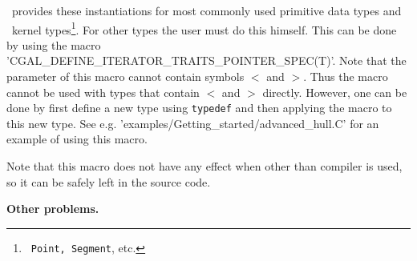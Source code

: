 \cgal\ provides
these instantiations for most commonly used primitive data types and
\cgal\ kernel types\footnote{\cgal\ \texttt{Point, Segment}, etc.}.
For other types the user must do this himself.  
This can be done by using the macro
\nonlinkedpath'CGAL_DEFINE_ITERATOR_TRAITS_POINTER_SPEC(T)'.
Note that the parameter of this macro cannot contain symbols $<$ and
$>$. Thus the macro cannot be used with types that contain $<$ and $>$
directly. However, one can be done by first define a new type using 
\texttt{typedef} and then applying the macro to this new type.
See e.g. \nonlinkedpath'examples/Getting_started/advanced_hull.C'
for an example of using this macro.

Note that this macro does not have any effect when other than
 compiler is used, so it can be safely left in the source code. 
\medskip

\textbf{Other problems.}

